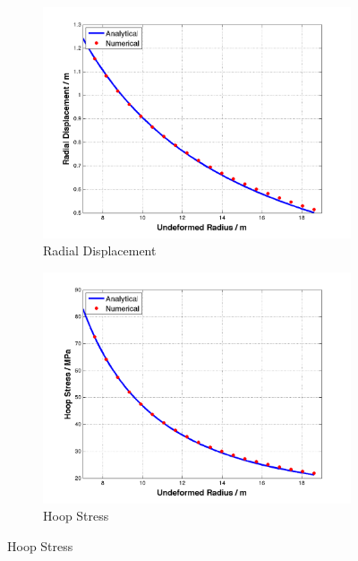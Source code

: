 \begin{figure}[t!p]
	\begin{subfigure}[b]{0.5\textwidth}
		\centering
		\includegraphics[width=\textwidth]{./figures/ur_50.png}
		\caption{Radial Displacement}
		\label{ur_50}
	\end{subfigure}
	\begin{subfigure}[b]{0.5\textwidth}
		\centering
		\includegraphics[width=\textwidth]{./figures/hoop_stress_50.png}
		\caption{Hoop Stress}
		\label{hoop_50}
	\end{subfigure}
	

\end{figure}

